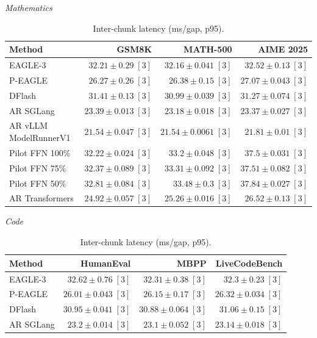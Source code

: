 \documentclass[conference,onecolumn]{IEEEtran}
\begin{document}
\begin{table}[!htp]
\centering\small
\setlength{\tabcolsep}{3pt}
\caption{Inter-chunk latency (ms/gap, p95).}
\label{tab:appendix-metric-pooled-gap-none}
\textit{Mathematics}\par\smallskip
\begin{tabular}{@{}>{\raggedright\arraybackslash}p{3.7cm}rrr@{}}
\toprule
Method & GSM8K & MATH-500 & AIME 2025 \\
\midrule
EAGLE-3 & \(32.21 \pm 0.29\;[3]\) & \(32.16 \pm 0.041\;[3]\) & \(32.52 \pm 0.13\;[3]\) \\
P-EAGLE & \(26.27 \pm 0.26\;[3]\) & \(26.38 \pm 0.15\;[3]\) & \(27.07 \pm 0.043\;[3]\) \\
DFlash & \(31.41 \pm 0.13\;[3]\) & \(30.99 \pm 0.039\;[3]\) & \(31.27 \pm 0.074\;[3]\) \\
AR \textperiodcentered{} SGLang & \(23.39 \pm 0.013\;[3]\) & \(23.18 \pm 0.018\;[3]\) & \(23.37 \pm 0.027\;[3]\) \\
AR \textperiodcentered{} vLLM ModelRunnerV1 & \(\mathbf{21.54} \pm 0.047\;[3]\) & \(\mathbf{21.54} \pm 0.0061\;[3]\) & \(\mathbf{21.81} \pm 0.01\;[3]\) \\
Pilot FFN 100\% & \(32.22 \pm 0.024\;[3]\) & \(33.2 \pm 0.048\;[3]\) & \(37.5 \pm 0.031\;[3]\) \\
Pilot FFN 75\% & \(32.37 \pm 0.089\;[3]\) & \(33.31 \pm 0.092\;[3]\) & \(37.51 \pm 0.082\;[3]\) \\
Pilot FFN 50\% & \(32.81 \pm 0.084\;[3]\) & \(33.48 \pm 0.3\;[3]\) & \(37.84 \pm 0.027\;[3]\) \\
AR \textperiodcentered{} Transformers & \(24.92 \pm 0.057\;[3]\) & \(25.26 \pm 0.016\;[3]\) & \(26.52 \pm 0.13\;[3]\) \\
\bottomrule
\end{tabular}\par\medskip
\textit{Code}\par\smallskip
\begin{tabular}{@{}>{\raggedright\arraybackslash}p{3.7cm}rrr@{}}
\toprule
Method & HumanEval & MBPP & LiveCodeBench \\
\midrule
EAGLE-3 & \(32.62 \pm 0.76\;[3]\) & \(32.31 \pm 0.38\;[3]\) & \(32.3 \pm 0.23\;[3]\) \\
P-EAGLE & \(26.01 \pm 0.043\;[3]\) & \(26.15 \pm 0.17\;[3]\) & \(26.32 \pm 0.034\;[3]\) \\
DFlash & \(30.95 \pm 0.041\;[3]\) & \(30.88 \pm 0.064\;[3]\) & \(31.06 \pm 0.15\;[3]\) \\
AR \textperiodcentered{} SGLang & \(23.2 \pm 0.014\;[3]\) & \(23.1 \pm 0.052\;[3]\) & \(23.14 \pm 0.018\;[3]\) \\

\end{tabular}
\end{table}
\end{document}
